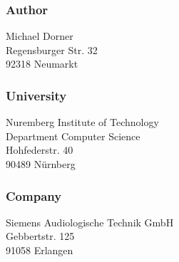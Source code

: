 \thispagestyle{empty}


\vspace*{4cm}
\subsubsection*{Author}
Michael Dorner\\
Regensburger Str. 32\\
92318 Neumarkt \\[1cm]


\subsubsection*{University}
Nuremberg Institute of Technology\\
Department Computer Science \\
Hohfederstr. 40 \\
90489 Nürnberg\\[1cm]


\subsubsection*{Company}
Siemens Audiologische Technik GmbH\\
Gebbertstr. 125 \\
91058 Erlangen
